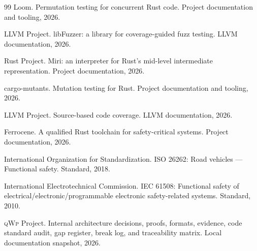 \documentclass[11pt,a4paper]{article}
\newcommand{\qwp}{\textsc{qWp}}
\begin{document}
\begin{thebibliography}{99}
Loom.
\newblock Permutation testing for concurrent Rust code.
\newblock Project documentation and tooling, 2026.

LLVM Project.
\newblock libFuzzer: a library for coverage-guided fuzz testing.
\newblock LLVM documentation, 2026.

Rust Project.
\newblock Miri: an interpreter for Rust's mid-level intermediate
representation.
\newblock Project documentation, 2026.

cargo-mutants.
\newblock Mutation testing for Rust.
\newblock Project documentation and tooling, 2026.

LLVM Project.
\newblock Source-based code coverage.
\newblock LLVM documentation, 2026.

Ferrocene.
\newblock A qualified Rust toolchain for safety-critical systems.
\newblock Project documentation, 2026.

International Organization for Standardization.
\newblock ISO 26262: Road vehicles --- Functional safety.
\newblock Standard, 2018.

International Electrotechnical Commission.
\newblock IEC 61508: Functional safety of electrical/electronic/programmable
electronic safety-related systems.
\newblock Standard, 2010.

\qwp{} Project.
\newblock Internal architecture decisions, proofs, formats, evidence, code
standard audit, gap register, break log, and traceability matrix.
\newblock Local documentation snapshot, 2026.

\end{thebibliography}
\end{document}
